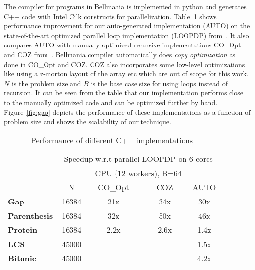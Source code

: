 The compiler for programs in Bellmania is implemented in 
python and generates C++ code with Intel Cilk constructs for parallelization.
Table~\ref{evaluation:cppruntimes} shows performance improvement for our 
auto-generated implementation (AUTO) on the state-of-the-art optimized parallel
loop implementation (LOOPDP) from~\cite{IPDPS15/Tithi}. It also compares AUTO with manually 
optimized recursive implementations CO\_Opt and COZ from~\cite{IPDPS15/Tithi}. 
Bellmania compiler automatically does \textit{copy optimization} 
as done in CO\_Opt and COZ. COZ also incorporates some low-level 
optimizations like using a z-morton layout of the array etc 
which are out of scope for this work. %
$N$ is the problem size and $B$ is the base case size for using loops 
instead of recursion. It can be seen from the table that our implementation 
performs close to the manually optimized code and can be optimized further by 
hand. Figure~\ref{fig:gap} depicts the performance of these implementations 
as a function of problem size and shows the scalability of our technique. %

\begin{table}
\centering
\begin{tabular}{|l|c|c|c|c|}
    \cline{2-4}
  \multicolumn{1}{c|}{} & \multicolumn{4}{c|}{\scriptsize Speedup w.r.t parallel LOOPDP on 6 cores}  \\
  \multicolumn{1}{c|}{} & \multicolumn{4}{c|}{\scriptsize   CPU (12 workers), B=64}  \\
  \multicolumn{1}{c|}{} & \multicolumn{1}{c|}{~~\sf N~~} & \multicolumn{1}{c|}{~~\sf CO\_Opt~~} & \multicolumn{1}{c|}{~~~\sf COZ~~~} & \multicolumn{1}{c|}{\sf AUTO}  \\
  \hline
  {\bf Gap}  & 16384 & 21x & 34x & 30x\\
  \hline
  {\bf Parenthesis}  & 16384  & 32x & 50x & 46x\\
  \hline
  {\bf Protein} & 16384  & 2.2x & 2.6x & 1.4x \\
  \hline
  {\bf LCS}  & 45000 & $-$ & $-$ & 1.5x \\
  \hline
  {\bf Bitonic}  & 45000  & $-$ & $-$ & 4.2x\\
  \hline
\end{tabular}
\caption{\label{evaluation:cppruntimes}
  Performance of different C++ implementations}
\end{table}


